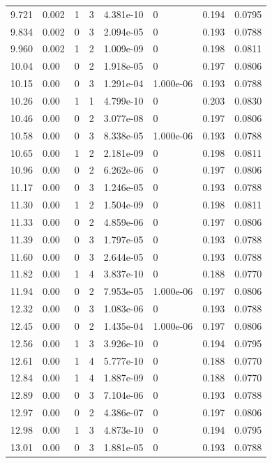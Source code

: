 \documentclass[preview]{standalone}
\begin{document}
{{{\begin{tabular}{L{1.2cm}C{1.2cm} C{0.3cm}C{0.5cm} C{1.4cm}C{1.4cm} C{1.4cm}C{1.4cm}}
  9.721  &  0.002  & 1     &  3 &  4.381e-10  & 0  & 0.194 &  0.0795   \\ 
  9.834  &  0.002  & 0     &  3 &  2.094e-05  & 0  & 0.193 &  0.0788   \\ 
  9.960  &  0.002  & 1     &  2 &  1.009e-09  & 0  & 0.198 &  0.0811   \\ 
  10.04  &  0.00  & 0     &  2 &  1.918e-05  & 0  & 0.197 &  0.0806   \\ 
  10.15  &  0.00  & 0     &  3 &  1.291e-04  & 1.000e-06  & 0.193 &  0.0788   \\ 
  10.26  &  0.00  & 1     &  1 &  4.799e-10  & 0  & 0.203 &  0.0830   \\ 
  10.46  &  0.00  & 0     &  2 &  3.077e-08  & 0  & 0.197 &  0.0806   \\ 
  10.58  &  0.00  & 0     &  3 &  8.338e-05  & 1.000e-06  & 0.193 &  0.0788   \\ 
  10.65  &  0.00  & 1     &  2 &  2.181e-09  & 0  & 0.198 &  0.0811   \\ 
  10.96  &  0.00  & 0     &  2 &  6.262e-06  & 0  & 0.197 &  0.0806   \\ 
  11.17  &  0.00  & 0     &  3 &  1.246e-05  & 0  & 0.193 &  0.0788   \\ 
  11.30  &  0.00  & 1     &  2 &  1.504e-09  & 0  & 0.198 &  0.0811   \\ 
  11.33  &  0.00  & 0     &  2 &  4.859e-06  & 0  & 0.197 &  0.0806   \\ 
  11.39  &  0.00  & 0     &  3 &  1.797e-05  & 0  & 0.193 &  0.0788   \\ 
  11.60  &  0.00  & 0     &  3 &  2.644e-05  & 0  & 0.193 &  0.0788   \\ 
  11.82  &  0.00  & 1     &  4 &  3.837e-10  & 0  & 0.188 &  0.0770   \\ 
  11.94  &  0.00  & 0     &  2 &  7.953e-05  & 1.000e-06  & 0.197 &  0.0806   \\ 
  12.32  &  0.00  & 0     &  3 &  1.083e-06  & 0  & 0.193 &  0.0788   \\ 
  12.45  &  0.00  & 0     &  2 &  1.435e-04  & 1.000e-06  & 0.197 &  0.0806   \\ 
  12.56  &  0.00  & 1     &  3 &  3.926e-10  & 0  & 0.194 &  0.0795   \\ 
  12.61  &  0.00  & 1     &  4 &  5.777e-10  & 0  & 0.188 &  0.0770   \\ 
  12.84  &  0.00  & 1     &  4 &  1.887e-09  & 0  & 0.188 &  0.0770   \\ 
  12.89  &  0.00  & 0     &  3 &  7.104e-06  & 0  & 0.193 &  0.0788   \\ 
  12.97  &  0.00  & 0     &  2 &  4.386e-07  & 0  & 0.197 &  0.0806   \\ 
  12.98  &  0.00  & 1     &  3 &  4.873e-10  & 0  & 0.194 &  0.0795   \\ 
  13.01  &  0.00  & 0     &  3 &  1.881e-05  & 0  & 0.193 &  0.0788   \\ 
\hline 
\end{tabular} 

}}}
\end{document}
